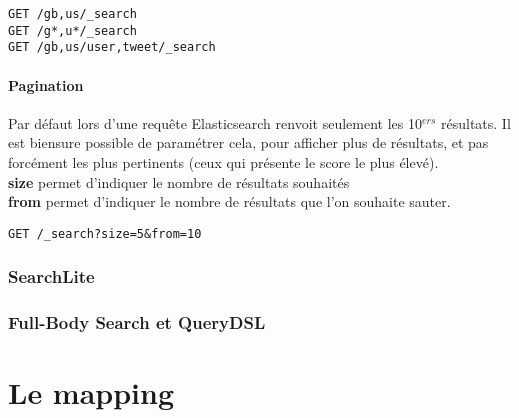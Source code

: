 \begin{lstlisting}[style=code,label={lst:APIsearchemptyexample4},caption={Une recherche multi-index ...}]
GET /gb,us/_search
GET /g*,u*/_search
GET /gb,us/user,tweet/_search
\end{lstlisting}

\paragraph{Pagination}
Par défaut lors d'une requête Elasticsearch renvoit seulement les 10$^{ers}$ résultats.
Il est biensure possible de paramétrer cela, pour afficher plus de résultats, et pas
forcément les plus pertinents (ceux qui présente le score le plus élevé).\\
\textbf{size} permet d'indiquer le nombre de résultats souhaités\\
\textbf{from} permet d'indiquer le nombre de résultats que l'on souhaite sauter.

\begin{lstlisting}[style=code,label={lst:APIsearchemptyexample4},caption={Pagination}]
GET /_search?size=5&from=10
\end{lstlisting}


\subsubsection{SearchLite}

\subsubsection{Full-Body Search et QueryDSL}

\section{Le mapping}
